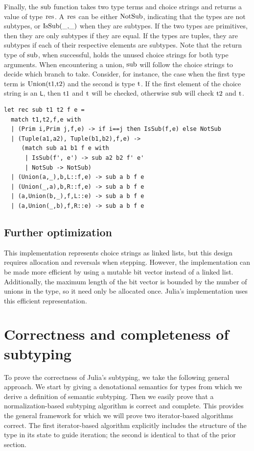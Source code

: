 \documentclass[a4paper,english]{lipics-v2019}
\renewcommand{\L}{{\tt L}\xspace}
\renewcommand{\c}[1]{\ensuremath{\text{\lstinline{#1}}}\xspace}
\begin{document}
\noindent
Finally, the \c{sub} function takes two type terms and choice strings and
returns a value of type \c{res}. A \c{res} can be either \c{NotSub}, indicating that the
types are not subtypes, or \c{IsSub(_,_)} when they are subtypes. If the two types
are primitives, then they are only subtypes if they are equal. If the types
are tuples, they are subtypes if each of their respective elements are subtypes. Note
that the return type of \c{sub}, when successful, holds the unused choice
strings for both type arguments. When encountering a union, \c{sub} will
follow the choice strings to decide which branch to take. Consider, for
instance, the case when the first type term is \c{Union(t1,t2)} and the
second is type \c{t}. If the first element of the choice string is an \L,
then \c{t1} and \c{t} will be checked, otherwise \c{sub} will check \c{t2}
and \c{t}.

\begin{lstlisting}
let rec sub t1 t2 f e =
  match t1,t2,f,e with 
  | (Prim i,Prim j,f,e) -> if i==j then IsSub(f,e) else NotSub
  | (Tuple(a1,a2), Tuple(b1,b2),f,e) ->
     (match sub a1 b1 f e with
      | IsSub(f', e') -> sub a2 b2 f' e'
      | NotSub -> NotSub)
  | (Union(a,_),b,L::f,e) -> sub a b f e
  | (Union(_,a),b,R::f,e) -> sub a b f e
  | (a,Union(b,_),f,L::e) -> sub a b f e
  | (a,Union(_,b),f,R::e) -> sub a b f e
\end{lstlisting}

\subsection{Further optimization}

This implementation represents choice strings as linked lists, but this design
requires allocation and reversals when stepping. However, the implementation
can be made more efficient by using a mutable bit vector instead of a linked
list. Additionally, the maximum length of the bit vector is bounded by the
number of unions in the type, so it need only be allocated once. Julia's
implementation uses this efficient representation.

\section{Correctness and completeness of subtyping}

To prove the correctness of Julia's subtyping, we take the following general
approach. We start by giving a denotational semantics for types from which
we derive a definition of semantic subtyping. Then we easily prove that a
normalization-based subtyping algorithm is correct and complete. This provides
the general framework for which we will prove two iterator-based algorithms correct.
The first iterator-based algorithm explicitly includes the structure of the type in
its state to guide iteration; the second is identical to that of the prior section.
\end{document}
